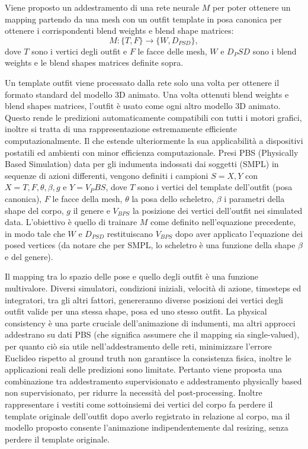 Viene proposto un addestramento di una rete neurale $M$ per poter ottenere un mapping partendo da una mesh con un outfit template in posa canonica per ottenere i corrispondenti blend weights e blend shape matrices:
\[
M: \{T, F\} \to \{W, D_{PSD}\},
\]
dove $T$ sono i vertici degli outfit e $F$ le facce delle mesh, $W$ e $D_PSD$ sono i blend weights e le blend shapes matrices definite sopra.

Un template outfit viene processato dalla rete solo una volta per ottenere il formato standard del modello 3D animato. Una volta ottenuti blend weights e blend shapes matrices, l’outfit è usato come ogni altro modello 3D animato. Questo rende le predizioni automaticamente compatibili con tutti i motori grafici, inoltre si tratta di una rappresentazione estremamente efficiente computazionalmente. Il che estende ulteriormente la sua applicabilità a dispositivi postatili ed ambienti con minor efficienza computazionale.
Presi PBS (Physically Based Simulation) data per gli indumenta indossati dai soggetti (SMPL) in sequenze di azioni differenti, vengono definiti i campioni $S={X,Y}$ con $X={T,F,\theta,\beta,g}$ e $Y={V_PBS}$, dove $T$ sono i vertici del template dell’outfit (posa canonica), $F$ le facce della mesh, $\theta$ la posa dello scheletro, $\beta$ i parametri della shape del corpo, $g$ il genere e $V_{BPS}$ la posizione dei vertici dell’outfit nei simulated data. L’obiettivo è quello di trainare $M$ come definito nell’equazione precedente, in modo tale che $W$ e $D_{PSD}$ restituiscano $V_{BPS}$ dopo aver applicato l’equazione dei posed vertices (da notare che per SMPL, lo scheletro è una funzione della shape $\beta$ e del genere).

Il mapping tra lo spazio delle pose e quello degli outfit è una funzione multivalore. Diversi simulatori, condizioni iniziali, velocità di azione, timesteps ed integratori, tra gli altri fattori, genereranno diverse posizioni dei vertici degli outfit valide per una stessa shape, posa ed uno stesso outfit.
La physical consistency è una parte cruciale dell’animazione di indumenti, ma altri approcci addestrano su dati PBS (che significa assumere che il mapping sia single-valued), per quanto ciò sia utile nell’addestramento delle reti, minimizzare l’errore Euclideo rispetto al ground truth non garantisce la consistenza fisica, inoltre le applicazioni reali delle predizioni sono limitate. Pertanto viene proposta una combinazione tra addestramento supervisionato e addestramento physically based non supervisionato, per ridurre la necessità del post-processing. Inoltre rappresentare i vestiti come sottoinsiemi dei vertici del corpo fa perdere il template originale dell’outfit dopo averlo registrato in relazione al corpo, ma il modello proposto consente l’animazione indipendentemente dal resizing, senza perdere il template originale.

